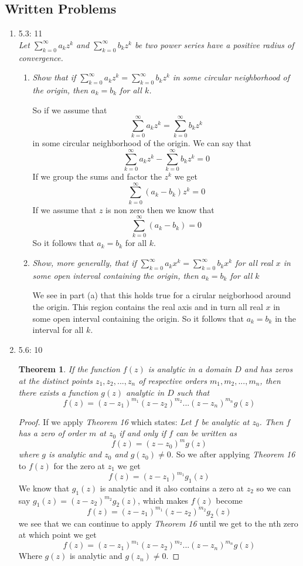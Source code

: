 \documentclass[11pt]{article}
\begin{document}

\subsection*{Written Problems}
\begin{enumerate}
\item 5.3: 11 \\
\textit{Let $\sum_{k=0}^{\infty}a_kz^k$ and $\sum_{k=0}^{\infty}b_kz^k$ be two power series have a positive radius of convergence.}
\begin{enumerate}
\item \textit{Show that if $\sum_{k=0}^{\infty}a_kz^k = \sum_{k=0}^{\infty}b_kz^k$ in some circular neighborhood of the origin, then $a_k=b_k$ for all $k$.}

So if we assume that 
$$\sum_{k=0}^{\infty}a_kz^k = \sum_{k=0}^{\infty}b_kz^k$$
in some circular neighborhood of the origin. We can say that 
$$\sum_{k=0}^{\infty}a_kz^k - \sum_{k=0}^{\infty}b_kz^k = 0$$
If we group the sums and factor the $z^k$ we get
$$\sum_{k=0}^{\infty}(a_k-b_k)z^k  = 0$$
If we assume that $z$ is non zero then we know that
$$\sum_{k=0}^{\infty}(a_k-b_k)  = 0$$
So it follows that $a_k=b_k$ for all $k$.

\item \textit{Show, more generally, that if $\sum_{k=0}^{\infty}a_kx^k = \sum_{k=0}^{\infty}b_kx^k$ for all real $x$ in some open interval containing the origin, then $a_k = b_k$ for all $k$}

We see in part (a) that this holds true for a cirular neigborhood around the origin. This region contains the real axis and in turn all real $x$ in some open interval containing the origin. So it follows that $a_k=b_k$ in the interval for all $k$.

\end{enumerate}

\item 5.6: 10 \\
\newtheorem{theo56}{Theorem}
\begin{theo56}
If the function $f(z)$ is analytic in a domain $D$ and has zeros at the distinct points $z_1,z_2,...,z_n$ of respective orders $m_1,m_2,...,m_n$, then there exists a function $g(z)$ analytic in $D$ such that 
$$f(z) = (z-z_1)^{m_1}(z-z_2)^{m_2}...(z-z_n)^{m_n}g(z)$$
\end{theo56}
\begin{proof}
If we apply \emph{Theorem 16} which states: \textit{Let $f$ be analytic at $z_0$. Then $f$ has a zero of order $m$ at $z_0$ if and only if $f$ can be written as $$f(z) = (z-z_0)^mg(z)$$ where $g$ is analytic and $z_0$ and $g(z_0)\ne 0$.}
So we after applying \emph{Theorem 16} to $f(z)$ for the zero at $z_1$ we get
$$f(z) = (z-z_1)^{m_1}g_1(z)$$
We know that $g_1(z)$ is analytic and it also contains a zero at $z_2$ so we can say $g_1(z) = (z-z_2)^{m_2}g_2(z)$, which makes $f(z)$ become
$$f(z) = (z-z_1)^{m_1}(z-z_2)^{m_2}g_2(z)$$
we see that we can continue to apply \emph{Theorem 16} until we get to the nth zero at which point we get
$$f(z) = (z-z_1)^{m_1}(z-z_2)^{m_2}...(z-z_n)^{m_n}g(z)$$
Where $g(z)$ is analytic and $g(z_n)\ne 0$.
\end{proof}
\end{enumerate}
\end{document}
